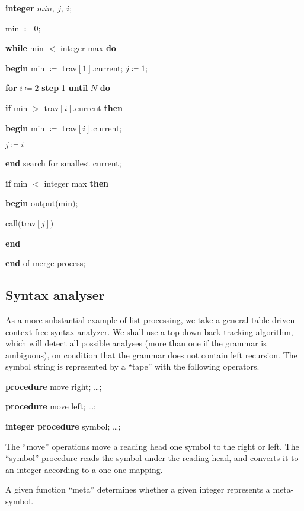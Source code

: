 \quad \textbf{integer} $min,\ j,\ i$;

\quad min $\coloneq 0$;

\quad \textbf{while} min $<$ integer max \textbf{do}

\quad \quad \textbf{begin} min $\coloneq$ trav$[1]$.current; $j\coloneq 1$;

\quad \quad \quad \textbf{for} $i\coloneq 2$ \textbf{step} 1 \textbf{until} $N$ \textbf{do}

\quad \quad \quad \quad \textbf{if} min $>$ trav$[i]$.current \textbf{then}

\quad \quad \quad \quad \quad \textbf{begin} min $\coloneq$ trav$[i]$.current;

\quad \quad \quad \quad \quad \quad $j\coloneq i$

\quad \quad \quad \quad \quad \textbf{end} search for smallest current;

\quad \quad \quad \textbf{if} min $<$ integer max \textbf{then}

\quad \quad \quad \quad \textbf{begin} output$($min$)$;

\quad \quad \quad \quad \quad call$($trav$[j])$

\quad \quad \quad \quad \textbf{end}

\quad \quad \textbf{end} of merge process;

\subsection{Syntax analyser}

As a more substantial example of list processing, we take a general table-driven context-free syntax analyzer. We shall use a top-down back-tracking algorithm, which will detect all possible analyses (more than one if the grammar is ambiguous), on condition that the grammar does not contain left recursion. The symbol string is represented by a ``tape'' with the following operators.

\quad \textbf{procedure} move right; \dots;

\quad \textbf{procedure} move left; \dots;

\quad \textbf{integer procedure} symbol; \dots;

\noindent
The ``move'' operations move a reading head one symbol to the right or left. The ``symbol'' procedure reads the symbol under the reading head, and converts it to an integer according to a one-one mapping.

A given function ``meta'' determines whether a given integer represents a meta-symbol.

